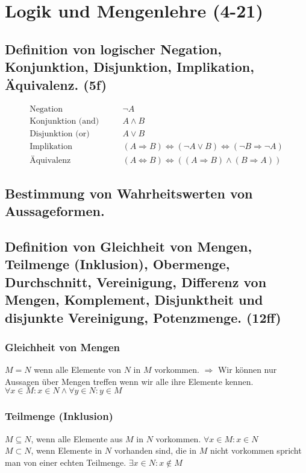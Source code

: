 \section{Logik und Mengenlehre (4-21)}

\subsection{Definition von logischer Negation, Konjunktion, Disjunktion, Implikation, Äquivalenz. (5f)}
\begin{equation}
\begin{split}
\text{Negation} \qquad & \neg A \\
\text{Konjunktion (and)}  \qquad & A \wedge B \\
\text{Disjunktion (or)}  \qquad & A \vee B \\
\text{Implikation}  \qquad & (A \Rightarrow B) \Leftrightarrow (\neg A \vee B) \Leftrightarrow (\neg B \Rightarrow \neg A) \\
\text{Äquivalenz}  \qquad & (A \Leftrightarrow B) \Leftrightarrow ((A \Rightarrow B) \wedge (B \Rightarrow A))
\end{split}
\end{equation}

\subsection{Bestimmung von Wahrheitswerten von Aussageformen.}

\subsection{Definition von Gleichheit von Mengen, Teilmenge (Inklusion), Obermenge, Durchschnitt, Vereinigung, Differenz von Mengen, Komplement, Disjunktheit und disjunkte Vereinigung, Potenzmenge. (12ff)}
\subsubsection{Gleichheit von Mengen}
$M = N$ wenn alle Elemente von $N$ in $M$ vorkommen. $\Rightarrow$ Wir können nur Aussagen über Mengen treffen wenn wir alle ihre Elemente kennen. $\forall x \in M: x \in N \wedge \forall y \in N: y \in M$
\subsubsection{Teilmenge (Inklusion)}
$M \subseteq N$, wenn alle Elemente aus $M$ in $N$ vorkommen. $\forall x \in M: x \in N$ \\
$M \subset N$, wenn Elemente in $N$ vorhanden sind, die in $M$ nicht vorkommen spricht man von einer echten Teilmenge. $\exists x \in N: x \notin M$


